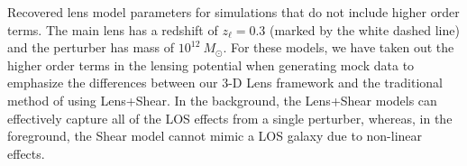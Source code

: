 \label{fig:frontback} Recovered lens model parameters for simulations that do not include higher order terms. The main lens has a redshift of $z_\ell = 0.3$ (marked by the white dashed line) and the perturber has mass of $10^{12}~ M_\odot$. For these models, we have taken out the higher order terms in the lensing potential when generating mock data to emphasize the differences between our 3-D Lens framework and the traditional method of using Lens+Shear. In the background, the Lens+Shear models can effectively capture all of the LOS effects from a single perturber, whereas, in the foreground, the Shear model cannot mimic a LOS galaxy due to non-linear effects.